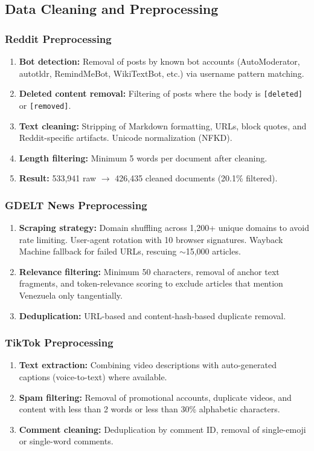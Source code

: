 \documentclass[12pt, letterpaper]{article}
\begin{document}
\subsection{Data Cleaning and Preprocessing}

\subsubsection{Reddit Preprocessing}
\begin{enumerate}[leftmargin=*]
  \item \textbf{Bot detection:} Removal of posts by known bot accounts (AutoModerator, autotldr, RemindMeBot, WikiTextBot, etc.) via username pattern matching.
  \item \textbf{Deleted content removal:} Filtering of posts where the body is \texttt{[deleted]} or \texttt{[removed]}.
  \item \textbf{Text cleaning:} Stripping of Markdown formatting, URLs, block quotes, and Reddit-specific artifacts. Unicode normalization (NFKD).
  \item \textbf{Length filtering:} Minimum 5 words per document after cleaning.
  \item \textbf{Result:} 533,941 raw $\rightarrow$ 426,435 cleaned documents (20.1\% filtered).
\end{enumerate}

\subsubsection{GDELT News Preprocessing}
\begin{enumerate}[leftmargin=*]
  \item \textbf{Scraping strategy:} Domain shuffling across 1,200+ unique domains to avoid rate limiting. User-agent rotation with 10 browser signatures. Wayback Machine fallback for failed URLs, rescuing $\sim$15,000 articles.
  \item \textbf{Relevance filtering:} Minimum 50 characters, removal of anchor text fragments, and token-relevance scoring to exclude articles that mention Venezuela only tangentially.
  \item \textbf{Deduplication:} URL-based and content-hash-based duplicate removal.
\end{enumerate}

\subsubsection{TikTok Preprocessing}
\begin{enumerate}[leftmargin=*]
  \item \textbf{Text extraction:} Combining video descriptions with auto-generated captions (voice-to-text) where available.
  \item \textbf{Spam filtering:} Removal of promotional accounts, duplicate videos, and content with less than 2 words or less than 30\% alphabetic characters.
  \item \textbf{Comment cleaning:} Deduplication by comment ID, removal of single-emoji or single-word comments.
\end{enumerate}
\end{document}
